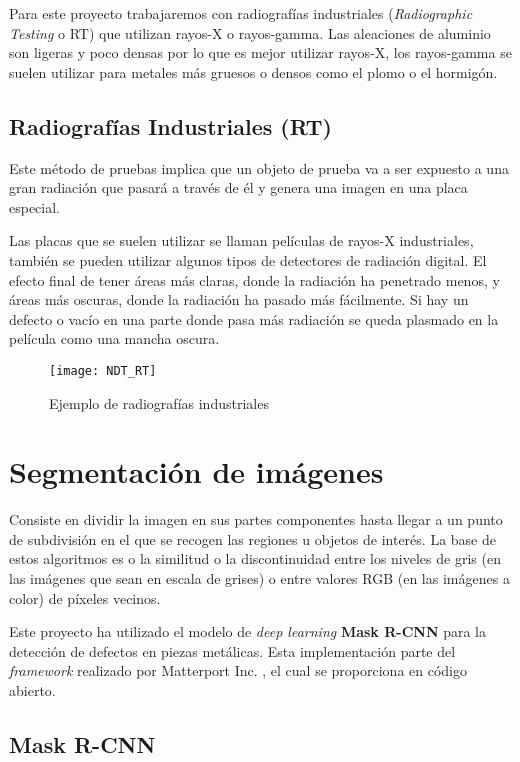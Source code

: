 Para este proyecto trabajaremos con radiografías industriales (\textit{Radiographic Testing} o RT) que utilizan rayos-X o rayos-gamma. Las aleaciones de aluminio son ligeras y poco densas por lo que es mejor utilizar rayos-X, los rayos-gamma se suelen utilizar para metales más gruesos o densos como el plomo o el hormigón.

\subsection{Radiografías Industriales (RT)}

Este método de pruebas implica que un objeto de prueba va a ser expuesto a una gran radiación que pasará a través de él y genera una imagen en una placa especial.

Las placas que se suelen utilizar se llaman películas de rayos-X industriales, también se pueden utilizar algunos tipos de detectores de radiación digital. El efecto final de tener áreas más claras, donde la radiación ha penetrado menos, y áreas más oscuras, donde la radiación ha pasado más fácilmente. Si hay un defecto o vacío en una parte donde pasa más radiación se queda plasmado en la película como una mancha oscura.

\begin{figure}[htb]
	\centering
	\texttt{[image: NDT\_RT]}
	\caption[Ejemplo de radiografías industriales]{Ejemplo de radiografías industriales \cite{NDT}}
\end{figure}

\section{Segmentación de imágenes}

Consiste en dividir la imagen en sus partes componentes hasta llegar a un punto de subdivisión en el que se recogen las regiones u objetos de interés. La base de estos algoritmos es o la similitud o la discontinuidad entre los niveles de gris (en las imágenes que sean en escala de grises) o entre valores RGB (en las imágenes a color) de píxeles vecinos.

Este proyecto ha utilizado el modelo de \textit{deep learning} \textbf{Mask R-CNN} \cite{segmentacionimagenes:MaskR-CNN} para la detección de defectos en piezas metálicas. Esta implementación parte del \textit{framework} realizado por Matterport Inc. \cite{segmentacionimagenes:MaskR-CNN2}, el cual se proporciona en código abierto.

\subsection{Mask R-CNN}

